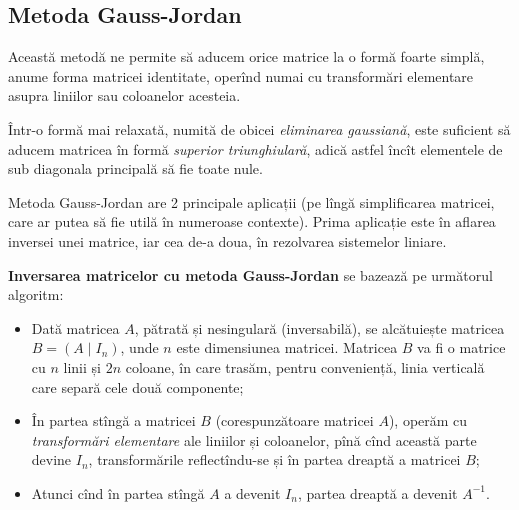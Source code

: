 \documentclass[11pt,a4paper]{article}
\theoremstyle{dotless}
\theoremstyle{dotlessdr}
\begin{document}
\subsection{Metoda Gauss-Jordan}

\indent\indent Această metodă ne permite să aducem orice matrice la o formă foarte simplă,
anume forma matricei identitate, operînd numai cu transformări elementare
asupra liniilor sau coloanelor acesteia.

Într-o formă mai relaxată, numită de obicei \emph{eliminarea gaussiană}, este suficient
să aducem matricea în formă \emph{superior triunghiulară}, adică astfel încît
elementele de sub diagonala principală să fie toate nule.

Metoda Gauss-Jordan are 2 principale aplicații (pe lîngă simplificarea matricei,
care ar putea să fie utilă în numeroase contexte). Prima aplicație este în aflarea
inversei unei matrice, iar cea de-a doua, în rezolvarea sistemelor liniare.

\textbf{Inversarea matricelor cu metoda Gauss-Jordan} se bazează pe următorul
algoritm:
\begin{itemize}
  \item Dată matricea $A$, pătrată și nesingulară (inversabilă), se alcătuiește
    matricea $B = (A \mid I_n)$, unde $n$ este dimensiunea matricei. Matricea $B$
    va fi o matrice cu $n$ linii și $2n$ coloane, în care trasăm, pentru conveniență,
    linia verticală care separă cele două componente;
  \item În partea stîngă a matricei $B$ (corespunzătoare matricei $A$), operăm cu
    \emph{transformări elementare} ale liniilor și coloanelor, pînă cînd această parte
    devine $I_n$, transformările reflectîndu-se și în partea dreaptă
    a matricei $B$;
  \item Atunci cînd în partea stîngă $A$ a devenit $I_n$, partea dreaptă a devenit $A^{-1}$.
\end{itemize}
\end{document}
